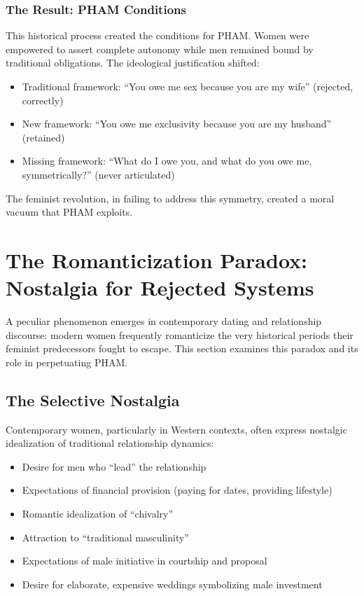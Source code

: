 \documentclass[12pt, letterpaper]{article}
\begin{document}
\subsubsection{The Result: PHAM Conditions}

This historical process created the conditions for PHAM. Women were empowered to assert complete autonomy while men remained bound by traditional obligations. The ideological justification shifted:

\begin{itemize}
    \item Traditional framework: ``You owe me sex because you are my wife'' (rejected, correctly)
    \item New framework: ``You owe me exclusivity because you are my husband'' (retained)
    \item Missing framework: ``What do I owe you, and what do you owe me, symmetrically?'' (never articulated)
\end{itemize}

The feminist revolution, in failing to address this symmetry, created a moral vacuum that PHAM exploits.

\section{The Romanticization Paradox: Nostalgia for Rejected Systems}

A peculiar phenomenon emerges in contemporary dating and relationship discourse: modern women frequently romanticize the very historical periods their feminist predecessors fought to escape. This section examines this paradox and its role in perpetuating PHAM.

\subsection{The Selective Nostalgia}

Contemporary women, particularly in Western contexts, often express nostalgic idealization of traditional relationship dynamics:

\begin{itemize}
    \item Desire for men who ``lead'' the relationship
    \item Expectations of financial provision (paying for dates, providing lifestyle)
    \item Romantic idealization of ``chivalry''
    \item Attraction to ``traditional masculinity''
    \item Expectations of male initiative in courtship and proposal
    \item Desire for elaborate, expensive weddings symbolizing male investment
\end{itemize}
\end{document}
